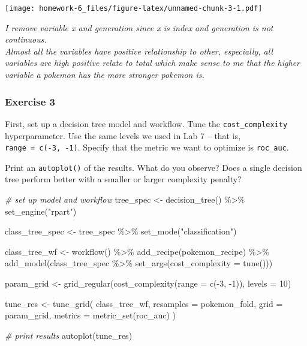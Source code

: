 \documentclass[
]{article}
\newenvironment{Shaded}{\begin{snugshade}}{\end{snugshade}}
\newcommand{\AttributeTok}[1]{\textcolor[rgb]{0.77,0.63,0.00}{#1}}
\newcommand{\CommentTok}[1]{\textcolor[rgb]{0.56,0.35,0.01}{\textit{#1}}}
\newcommand{\DecValTok}[1]{\textcolor[rgb]{0.00,0.00,0.81}{#1}}
\newcommand{\FunctionTok}[1]{\textcolor[rgb]{0.00,0.00,0.00}{#1}}
\newcommand{\NormalTok}[1]{#1}
\newcommand{\OtherTok}[1]{\textcolor[rgb]{0.56,0.35,0.01}{#1}}
\newcommand{\SpecialCharTok}[1]{\textcolor[rgb]{0.00,0.00,0.00}{#1}}
\newcommand{\StringTok}[1]{\textcolor[rgb]{0.31,0.60,0.02}{#1}}
\begin{document}
\texttt{[image: homework-6\_files/figure-latex/unnamed-chunk-3-1.pdf]}

\hfill\break
\emph{I remove variable x and generation since x is index and generation
is not continuous.}\\
\emph{Almost all the variables have positive relationship to other,
especially, all variables are high positive relate to total which make
sense to me that the higher variable a pokemon has the more stronger
pokemon is.}

\hypertarget{exercise-3}{%
\subsubsection{Exercise 3}\label{exercise-3}}

First, set up a decision tree model and workflow. Tune the
\texttt{cost\_complexity} hyperparameter. Use the same levels we used in
Lab 7 -- that is, \texttt{range\ =\ c(-3,\ -1)}. Specify that the metric
we want to optimize is \texttt{roc\_auc}.

Print an \texttt{autoplot()} of the results. What do you observe? Does a
single decision tree perform better with a smaller or larger complexity
penalty?

\begin{Shaded}
\begin{Highlighting}[]
\CommentTok{\# set up model and workflow}
\NormalTok{tree\_spec }\OtherTok{\textless{}{-}} \FunctionTok{decision\_tree}\NormalTok{() }\SpecialCharTok{\%\textgreater{}\%}
  \FunctionTok{set\_engine}\NormalTok{(}\StringTok{"rpart"}\NormalTok{)}

\NormalTok{class\_tree\_spec }\OtherTok{\textless{}{-}}\NormalTok{ tree\_spec }\SpecialCharTok{\%\textgreater{}\%}
  \FunctionTok{set\_mode}\NormalTok{(}\StringTok{"classification"}\NormalTok{)}

\NormalTok{class\_tree\_wf }\OtherTok{\textless{}{-}} \FunctionTok{workflow}\NormalTok{() }\SpecialCharTok{\%\textgreater{}\%}
  \FunctionTok{add\_recipe}\NormalTok{(pokemon\_recipe) }\SpecialCharTok{\%\textgreater{}\%}
  \FunctionTok{add\_model}\NormalTok{(class\_tree\_spec }\SpecialCharTok{\%\textgreater{}\%} 
  \FunctionTok{set\_args}\NormalTok{(}\AttributeTok{cost\_complexity =} \FunctionTok{tune}\NormalTok{())) }
 

\NormalTok{param\_grid }\OtherTok{\textless{}{-}} \FunctionTok{grid\_regular}\NormalTok{(}\FunctionTok{cost\_complexity}\NormalTok{(}\AttributeTok{range =} \FunctionTok{c}\NormalTok{(}\SpecialCharTok{{-}}\DecValTok{3}\NormalTok{, }\SpecialCharTok{{-}}\DecValTok{1}\NormalTok{)), }\AttributeTok{levels =} \DecValTok{10}\NormalTok{)}

\NormalTok{tune\_res }\OtherTok{\textless{}{-}} \FunctionTok{tune\_grid}\NormalTok{(}
\NormalTok{  class\_tree\_wf, }
  \AttributeTok{resamples =}\NormalTok{ pokemon\_fold, }
  \AttributeTok{grid =}\NormalTok{ param\_grid, }
  \AttributeTok{metrics =} \FunctionTok{metric\_set}\NormalTok{(roc\_auc)}
\NormalTok{)}

\CommentTok{\# print results}
\FunctionTok{autoplot}\NormalTok{(tune\_res)}
\end{Highlighting}
\end{Shaded}
\end{document}
